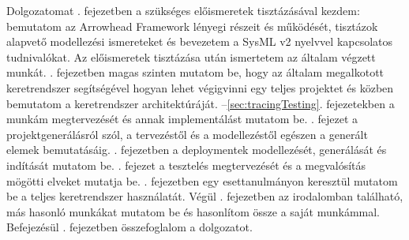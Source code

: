 Dolgozatomat . fejezetben a szükséges előismeretek tisztázásával kezdem: bemutatom az Arrowhead Framework lényegi részeit és működését, tisztázok alapvető modellezési ismereteket és bevezetem a SysML v2 nyelvvel kapcsolatos tudnivalókat. Az előismeretek tisztázása után ismertetem az általam végzett munkát. . fejezetben magas szinten mutatom be, hogy az általam megalkotott keretrendszer segítségével hogyan lehet végigvinni egy teljes projektet és közben bemutatom a keretrendszer architektúráját. --\ref{sec:tracingTesting}. fejezetekben a munkám megtervezését és annak implementálást mutatom be. . fejezet a projektgenerálásról szól, a tervezéstől és a modellezéstől egészen a generált elemek bemutatásáig. . fejezetben a deploymentek modellezését, generálását és indítását mutatom be. . fejezet a tesztelés megtervezését és a megvalósítás mögötti elveket mutatja be. . fejezetben egy esettanulmányon keresztül mutatom be a teljes keretrendszer használatát. Végül . fejezetben az irodalomban található, más hasonló munkákat mutatom be és hasonlítom össze a saját munkámmal. Befejezésül . fejezetben összefoglalom a dolgozatot.
